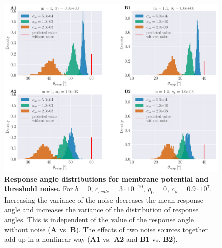     \begin{figure}[H]
    	\begin{center}
			\includegraphics[width=\textwidth]{figure_stationary_noisy_params.pdf}
    	\end{center}
    	\caption{\textbf{Response angle distributions for membrane potential and threshold noise.} For $b=0$, $c_{scale}=3\cdot10^{-10}$, $\rho_{0}=0$, $c_{\rho}=0.9\cdot 10^{7}$. Increasing the variance of the noise decreases the mean response angle and increases the variance of the distribution of response angles. This is independent of the value of the response angle without noise (\textbf{A} vs. \textbf{B}). The effects of two noise sources together add up in a nonlinear way (\textbf{A1} vs. \textbf{A2} and \textbf{B1} vs. \textbf{B2}).}
    	\label{fig:effect_noise_stationary}
    \end{figure}
    
